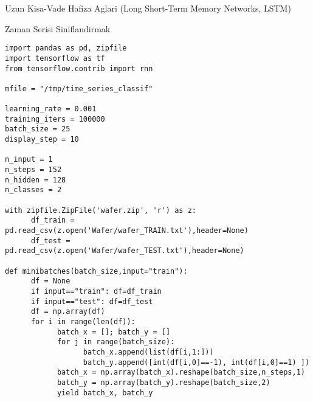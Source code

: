 \documentclass[12pt,fleqn]{article}\usepackage{../../common}
\begin{document}
Uzun Kisa-Vade Hafiza Aglari (Long Short-Term Memory Networks, LSTM)

Zaman Serisi Siniflandirmak

\begin{verbatim}
import pandas as pd, zipfile
import tensorflow as tf
from tensorflow.contrib import rnn

mfile = "/tmp/time_series_classif"

learning_rate = 0.001
training_iters = 100000
batch_size = 25
display_step = 10

n_input = 1 
n_steps = 152 
n_hidden = 128 
n_classes = 2

with zipfile.ZipFile('wafer.zip', 'r') as z:
      df_train =  pd.read_csv(z.open('Wafer/wafer_TRAIN.txt'),header=None)
      df_test =  pd.read_csv(z.open('Wafer/wafer_TEST.txt'),header=None)

def minibatches(batch_size,input="train"):
      df = None
      if input=="train": df=df_train
      if input=="test": df=df_test
      df = np.array(df)
      for i in range(len(df)):
            batch_x = []; batch_y = []
            for j in range(batch_size):
                  batch_x.append(list(df[i,1:]))
                  batch_y.append([int(df[i,0]==-1), int(df[i,0]==1) ])
            batch_x = np.array(batch_x).reshape(batch_size,n_steps,1)
            batch_y = np.array(batch_y).reshape(batch_size,2)
            yield batch_x, batch_y                  

\end{verbatim}
\end{document}
